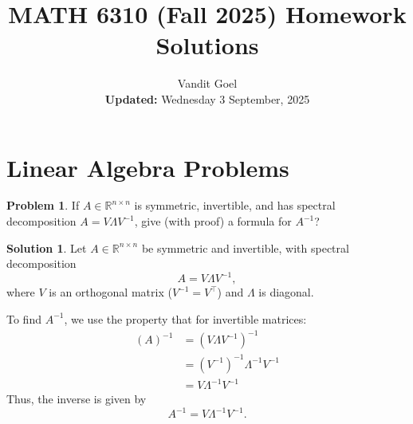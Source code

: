 \documentclass{amsart}[11pt]
\title{MATH 6310 (Fall 2025) Homework Solutions}
\author{Vandit Goel\\\textbf{Updated:} Wednesday  3 September, 2025}
\theoremstyle{definition}
\newtheorem{problem}{Problem}
\newtheorem{solution}{Solution}
\newcommand{\R}{\mathbb{R}}
\begin{document}
\maketitle

\section{Linear Algebra Problems}

\begin{problem}
If $A\in\R^{n\times n}$ is symmetric, invertible, and has spectral decomposition $A=V\Lambda V^{-1}$, give (with proof) a formula for $A^{-1}$?

\begin{solution}
Let $A \in \mathbb{R}^{n \times n}$ be symmetric and invertible, with spectral decomposition
\[
A = V \Lambda V^{-1},
\]
where $V$ is an orthogonal matrix ($V^{-1} = V^\top$) and $\Lambda$ is diagonal.

\vspace{\baselineskip}
\noindent To find $A^{-1}$, we use the property that for invertible matrices:
\begin{align*}
	(A)^{-1} &= (V \Lambda V^{-1})^{-1} \\
	&= (V^{-1})^{-1}\Lambda^{-1} V^{-1} \\
	&= V\Lambda^{-1} V^{-1}
\end{align*}
Thus, the inverse is given by
\[
A^{-1} = V \Lambda^{-1} V^{-1}.
\]
\end{solution}
\end{problem}
\end{document}
